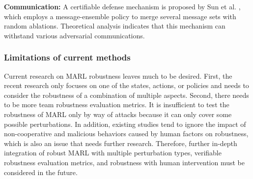 \documentclass[acmsmall]{acmart}
\begin{document}
\textbf{Communication: } A certifiable defense mechanism is proposed by Sun et al. \cite{sun2023certifiably}, which employs a message-ensemble policy to merge several message sets with random ablations. Theoretical analysis indicates that this mechanism can withstand various adversarial communications.

\subsubsection{Limitations of current methods}
Current research on MARL robustness leaves much to be desired. First, the recent research only focuses on one of the states, actions, or policies and needs to consider the robustness of a combination of multiple aspects. Second, there needs to be more team robustness evaluation metrics. It is insufficient to test the robustness of MARL only by way of attacks because it can only cover some possible perturbations. In addition, existing studies tend to ignore the impact of non-cooperative and malicious behaviors caused by human factors on robustness, which is also an issue that needs further research. Therefore, further in-depth integration of robust MARL with multiple perturbation types, verifiable robustness evaluation metrics, and robustness with human intervention must be considered in the future.
\end{document}
